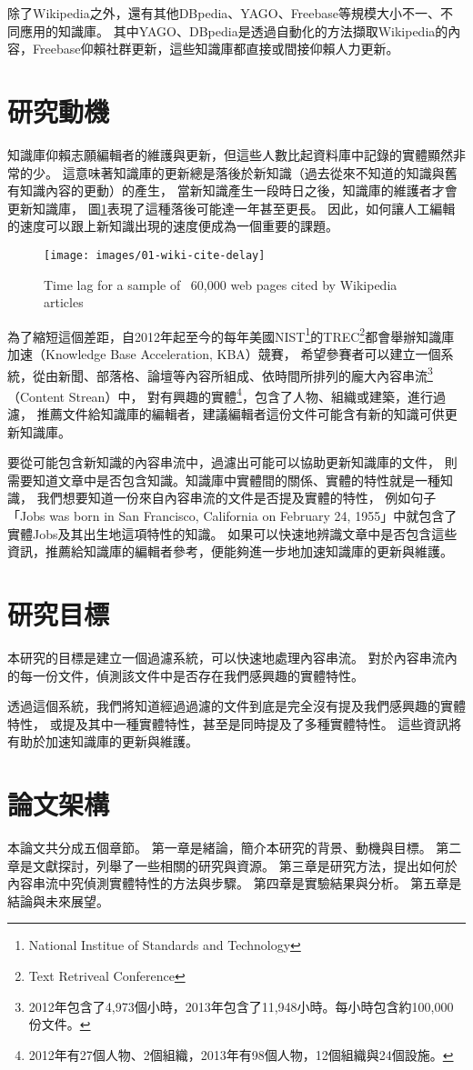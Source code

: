 除了Wikipedia之外，還有其他DBpedia\cite{dbpedia}、YAGO\cite{yago}、Freebase\cite{freebase}等規模大小不一、不同應用的知識庫。
其中YAGO、DBpedia是透過自動化的方法擷取Wikipedia的內容，Freebase仰賴社群更新，這些知識庫都直接或間接仰賴人力更新。  %

%
%
\section{研究動機}
知識庫仰賴志願編輯者的維護與更新，但這些人數比起資料庫中記錄的實體顯然非常的少。
這意味著知識庫的更新總是落後於新知識（過去從來不知道的知識與舊有知識內容的更動）的產生，
當新知識產生一段時日之後，知識庫的維護者才會更新知識庫，
圖\ref{i:wikicitenews}表現了這種落後可能達一年甚至更長。
因此，如何讓人工編輯的速度可以跟上新知識出現的速度便成為一個重要的課題。

\begin{figure}
    \centering
    \texttt{[image: images/01-wiki-cite-delay]}
    \caption{Time lag for a sample of ~60,000 web pages cited by Wikipedia articles\cite{kba2012} }
    \label{i:wikicitenews}
\end{figure}

為了縮短這個差距，自2012年起至今的每年美國NIST\footnote{National Institue of Standards and Technology}的TREC\footnote{Text Retriveal Conference}都會舉辦知識庫加速（Knowledge Base Acceleration, KBA）競賽，
希望參賽者可以建立一個系統，從由新聞、部落格、論壇等內容所組成、依時間所排列的龐大內容串流\footnote{2012年包含了4,973個小時，2013年包含了11,948小時。\cite{kba2013}每小時包含約100,000份文件。}（Content Strean）中，
對有興趣的實體\footnote{2012年有27個人物、2個組織，2013年有98個人物，12個組織與24個設施。}，包含了人物、組織或建築，進行過濾，
推薦文件給知識庫的編輯者，建議編輯者這份文件可能含有新的知識可供更新知識庫。

要從可能包含新知識的內容串流中，過濾出可能可以協助更新知識庫的文件，
則需要知道文章中是否包含知識。知識庫中實體間的關係、實體的特性就是一種知識，
我們想要知道一份來自內容串流的文件是否提及實體的特性，
例如句子「Jobs was born in San Francisco, California on February 24, 1955」中就包含了實體Jobs及其出生地這項特性的知識。
如果可以快速地辨識文章中是否包含這些資訊，推薦給知識庫的編輯者參考，便能夠進一步地加速知識庫的更新與維護。

%
%
\section{研究目標}
本研究的目標是建立一個過濾系統，可以快速地處理內容串流。
對於內容串流內的每一份文件，偵測該文件中是否存在我們感興趣的實體特性。

透過這個系統，我們將知道經過過濾的文件到底是完全沒有提及我們感興趣的實體特性，
或提及其中一種實體特性，甚至是同時提及了多種實體特性。
這些資訊將有助於加速知識庫的更新與維護。

%
%
\section{論文架構}
本論文共分成五個章節。
第一章是緒論，簡介本研究的背景、動機與目標。
第二章是文獻探討，列舉了一些相關的研究與資源。
第三章是研究方法，提出如何於內容串流中究偵測實體特性的方法與步驟。
第四章是實驗結果與分析。    %
第五章是結論與未來展望。    %

